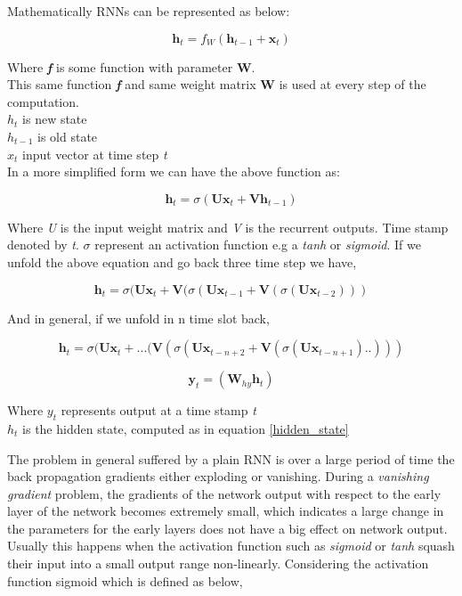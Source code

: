 Mathematically RNNs can be represented as below: 

\begin{equation}
	\textbf{h}_t = f_W(\textbf{h}_{t-1} + \textbf{x}_{t}) 
\end{equation}

Where \textbf{\textit{ f}} is some function with parameter \textbf{W}. \\
This same function \textbf{\textit{ f}} and same weight matrix \textbf{W} is used at every step of the computation. \\
\textit{$h_t$} is new state \\
\textit{$h_{t-1}$} is old state \\
\textit{$x_t$} input vector at time step \textit{t}\\

In a more simplified form we can have the above function as:

\begin{equation}\label{hidden_state}
	\textbf{h}_t = \sigma (\textbf{Ux}_t + \textbf{Vh}_{t-1}) 
\end{equation}

Where \textit{U} is the input weight matrix and \textit{V} is the recurrent outputs. Time stamp denoted by \textit{t}. $\sigma$ represent an activation function e.g a \textit{tanh} or \textit{sigmoid}. If we unfold the above equation and go back three time step we have,

\begin{equation}
	\textbf{h}_t = \sigma (\textbf{Ux}_t + \textbf{V}(\sigma(\textbf{Ux}_{t-1} + \textbf{V}(\sigma(\textbf{Ux}_{t-2})))
\end{equation}

And in general, if we unfold in n time slot back,

\begin{equation}
\textbf{h}_t = \sigma (\textbf{Ux}_t + ...( \textbf{V}(\sigma(\textbf{Ux}_{t-n+2} + \textbf{V}(\sigma(\textbf{Ux}_{t-n+1})..)))
\end{equation}

\begin{equation}
	\textbf{y}_t = (\textbf{W}_{hy}  \textbf{h}_{t}) 
\end{equation}

Where \textbf{$y_t$}  represents output at a time stamp \textit{t} \\
\textbf{$h_t$} is the hidden state, computed as in equation \ref{hidden_state}

The problem in general suffered by a plain RNN is over a large period of time the back propagation gradients either exploding or vanishing. During a \textit{vanishing gradient } problem, the gradients of the network output with respect to the early layer of the network becomes extremely small, which indicates a large change in the parameters for the early layers does not have a big effect on network output. Usually this happens when the activation function such as \textit{sigmoid} or \textit{tanh} squash their input into a small output range non-linearly. Considering the activation function sigmoid which is defined as below,

